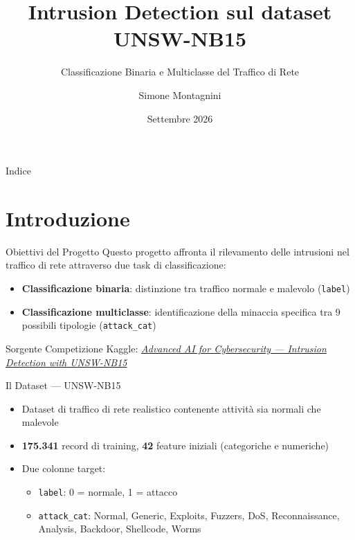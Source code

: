 \documentclass{beamer}
\title{Intrusion Detection sul dataset UNSW-NB15}
\subtitle{Classificazione Binaria e Multiclasse del Traffico di Rete}
\author{Simone Montagnini}
\institute{Università di Bologna}
\date{Settembre 2026}
\begin{document}
\frame{\titlepage}

\begin{frame}{Indice}
  \tableofcontents
\end{frame}

\section{Introduzione}

\begin{frame}{Obiettivi del Progetto}
  Questo progetto affronta il rilevamento delle intrusioni nel traffico di rete attraverso due task di classificazione:
  \begin{itemize}
    \item \textbf{Classificazione binaria}: distinzione tra traffico normale e malevolo
      (\texttt{label})
    \item \textbf{Classificazione multiclasse}: identificazione della minaccia specifica tra 9 possibili tipologie (\texttt{attack\_cat})
  \end{itemize}
  \vspace{0.5cm}
  \begin{block}{Sorgente}
  Competizione Kaggle: \href{https://www.kaggle.com/competitions/advanced-ai-for-cybersecurity-intrusion-detection-with-unsw-nb-15/overview}{\textit{Advanced AI for Cybersecurity — Intrusion Detection with UNSW-NB15}}
  \end{block}
\end{frame}

\begin{frame}{Il Dataset — UNSW-NB15}
  \begin{itemize}
    \item Dataset di traffico di rete realistico contenente attività sia normali che malevole
    \item \textbf{175.341} record di training, \textbf{42} feature iniziali
      (categoriche e numeriche)
    \item Due colonne target:
      \begin{itemize}
        \item \texttt{label}: 0 = normale, 1 = attacco
        \item \texttt{attack\_cat}: Normal, Generic, Exploits, Fuzzers, DoS,
          Reconnaissance, Analysis, Backdoor, Shellcode, Worms
      \end{itemize}
  \end{itemize}
\end{frame}
\end{document}
